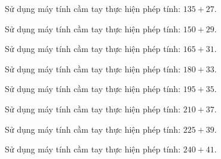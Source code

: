 
\begin{ex}
  Sử dụng máy tính cầm tay thực hiện phép tính: $135 + 27$.
\end{ex}

\begin{ex}
  Sử dụng máy tính cầm tay thực hiện phép tính: $150 + 29$.
\end{ex}

\begin{ex}
  Sử dụng máy tính cầm tay thực hiện phép tính: $165 + 31$.
\end{ex}

\begin{ex}
  Sử dụng máy tính cầm tay thực hiện phép tính: $180 + 33$.
\end{ex}

\begin{ex}
  Sử dụng máy tính cầm tay thực hiện phép tính: $195 + 35$.
\end{ex}

\begin{ex}
  Sử dụng máy tính cầm tay thực hiện phép tính: $210 + 37$.
\end{ex}

\begin{ex}
  Sử dụng máy tính cầm tay thực hiện phép tính: $225 + 39$.
\end{ex}

\begin{ex}
  Sử dụng máy tính cầm tay thực hiện phép tính: $240 + 41$.
\end{ex}

